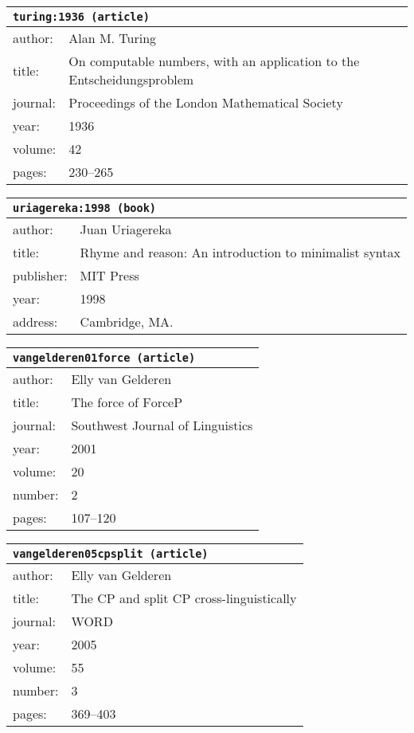 \documentclass{article}
\begin{document}
\bigskip

\begin{tabular}{p{}p{}}
\multicolumn{2}{l}{\texttt{turing:1936 (article)}}\\
\hline
author: & Alan M. Turing\\
title: & On computable numbers, with an application to the \textsc{E}ntscheidungsproblem\\
journal: & Proceedings of the London Mathematical Society\\
year: & 1936\\
volume: & 42\\
pages: & 230--265\\
\end{tabular}

\bigskip

\begin{tabular}{p{}p{}}
\multicolumn{2}{l}{\texttt{uriagereka:1998 (book)}}\\
\hline
author: & Juan Uriagereka\\
title: & Rhyme and reason: An introduction to minimalist syntax\\
publisher: & MIT Press\\
year: & 1998\\
address: & Cambridge, MA.\\
\end{tabular}

\bigskip

\begin{tabular}{p{}p{}}
\multicolumn{2}{l}{\texttt{vangelderen01force (article)}}\\
\hline
author: & Elly {van Gelderen}\\
title: & The force of \textsc{F}orce\textsc{P}\\
journal: & Southwest Journal of Linguistics\\
year: & 2001\\
volume: & 20\\
number: & 2\\
pages: & 107--120\\
\end{tabular}

\bigskip

\begin{tabular}{p{}p{}}
\multicolumn{2}{l}{\texttt{vangelderen05cpsplit (article)}}\\
\hline
author: & Elly {van Gelderen}\\
title: & The \textsc{CP} and split \textsc{CP} cross-linguistically\\
journal: & WORD\\
year: & 2005\\
volume: & 55\\
number: & 3\\
pages: & 369--403\\
\end{tabular}
\end{document}
